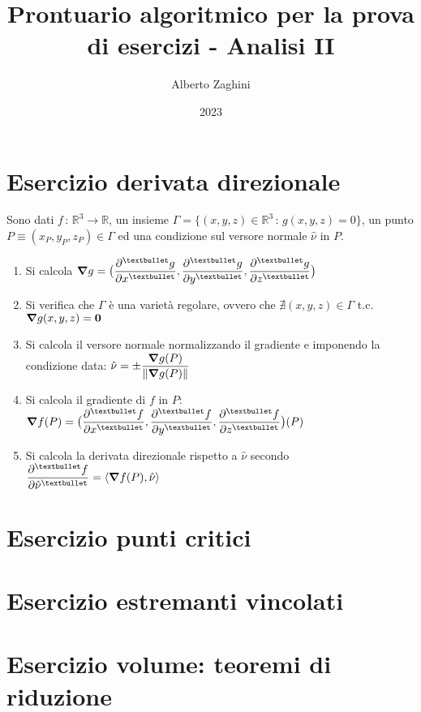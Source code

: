 \documentclass[10pt, oneside]{article}
\title{Prontuario algoritmico per la prova di esercizi - Analisi II}
\author{Alberto Zaghini}
\date{2023}
\begin{document}
\maketitle

\section{Esercizio derivata direzionale}

Sono dati $f \, : \, \mathbb{R}^3 \rightarrow \mathbb{R}$, un insieme $\Gamma = \{(x,y,z) \in \mathbb{R}^3 \, : \, g(x,y,z) = 0\}$, un punto $P \equiv (x_P, y_P, z_P) \in \Gamma$ ed una condizione sul versore normale $\hat{\nu}$ in $P$.

\begin{enumerate}

\item Si calcola $\displaystyle \grad g = \big(
\pdv[•]{g}{x}, \pdv[•]{g}{y}, \pdv[•]{g}{z} \big)$

\item Si verifica che $\Gamma$ è una varietà regolare, ovvero che $\nexists (x,y,z) \in \Gamma$ t.c. $\grad g (x,y,z) = \mathbf{0}$

\item Si calcola il versore normale normalizzando il gradiente e imponendo la condizione data: $\displaystyle \hat{\nu} = \pm \frac{\grad g (P)}{\| \grad g (P) \|}$

\item Si calcola il gradiente di $f$ in $P$: $\displaystyle \grad f (P) = \big(
\pdv[•]{f}{x}, \pdv[•]{f}{y}, \pdv[•]{f}{z} \big) (P)$

\item Si calcola la derivata direzionale rispetto a $\hat{\nu}$ secondo $\displaystyle \pdv[•]{f}{\hat{\nu}} (P) = \langle \grad f(P), \hat{\nu} \rangle$

\end{enumerate}

\section{Esercizio punti critici}

\section{Esercizio estremanti vincolati}

\section{Esercizio volume: teoremi di riduzione}
\end{document}
